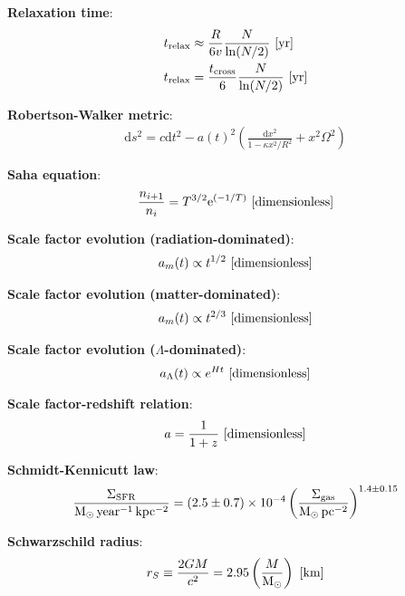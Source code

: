 \documentclass[a4paper,11pt]{article}
\begin{document}
{\noindent}\textbf{Relaxation time}:
\begin{align*}
    t_\mathrm{relax} &\approx \frac{R}{6v} \frac{N}{\ln(N/2)} ~ [{\rm yr}] \\
    t_\mathrm{relax} &= \frac{t_\mathrm{cross}}{6} \frac{N}{\ln(N/2)} ~ [{\rm yr}]
\end{align*}

{\noindent}\textbf{Robertson-Walker metric}:
\begin{align*}
    \mathrm{d}s^2 = c\mathrm{d}t^2 -a(t)^2 \left( \frac{\mathrm{d}x^2}{1-\kappa x^2/R^2} + x^2\Omega^2 \right)
\end{align*}

{\noindent}\textbf{Saha equation}:
\begin{align*}
    \frac{n_{i+1}}{n_i} = T^{3/2}\mathrm{e}^{(-1/T)} ~ [{\rm dimensionless}]
\end{align*}

{\noindent}\textbf{Scale factor evolution (radiation-dominated)}:
\begin{align*}
    a_m(t) \propto t^{1/2} ~ [{\rm dimensionless}]
\end{align*}

{\noindent}\textbf{Scale factor evolution (matter-dominated)}:
\begin{align*}
    a_m(t) \propto t^{2/3} ~ [{\rm dimensionless}]
\end{align*}

{\noindent}\textbf{Scale factor evolution ($\Lambda$-dominated)}:
\begin{align*}
    a_\Lambda(t) \propto e^{Ht} ~ [{\rm dimensionless}]
\end{align*}

{\noindent}\textbf{Scale factor-redshift relation}:
\begin{align*}
    a = \dfrac{1}{1+z} ~ [{\rm dimensionless}]
\end{align*}

{\noindent}\textbf{Schmidt-Kennicutt law}:
\begin{align*}
    \frac{\Sigma_\mathrm{SFR}}{{\rm M_\odot\,year^{-1}\,kpc^{-2}}} = (2.5\pm0.7)\times10^{-4} \left(\frac{\Sigma_\mathrm{gas}}{{\rm M_\odot\,pc^{-2}}}\right)^{1.4\pm0.15}
\end{align*}

{\noindent}\textbf{Schwarzschild radius}:
\begin{align*}
    r_S \equiv \frac{2GM}{c^2} = 2.95\left(\frac{M}{{\rm M_\odot}}\right) ~ [{\rm km}]
\end{align*}
\end{document}
